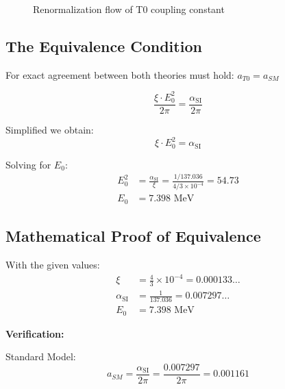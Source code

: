 \documentclass[12pt,a4paper]{article}
\numberwithin{equation}{section}
\newcommand{\xipar}{\xi}
\newcommand{\epsilonT}{\varepsilon}
\newcommand{\alphaSI}{\alpha_{\text{SI}}}
\newcommand{\Eo}{E_0}
\begin{document}
	\begin{figure}[h]
		\centering
		\caption{Renormalization flow of T0 coupling constant}
		\label{fig:renormalization_flow}
	\end{figure}
	
	\subsection{The Equivalence Condition}
	
	For exact agreement between both theories must hold: $a_{T0} = a_{SM}$
	
	\begin{equation}
		\frac{\xipar \cdot \Eo^2}{2\pi} = \frac{\alphaSI}{2\pi}
		\label{eq:equivalence_condition}
	\end{equation}
	
	Simplified we obtain:
	\begin{equation}
		\xipar \cdot \Eo^2 = \alphaSI
		\label{eq:simplified_equivalence}
	\end{equation}
	
	Solving for $\Eo$:
	\begin{align}
		\Eo^2 &= \frac{\alphaSI}{\xipar} = \frac{1/137.036}{4/3 \times 10^{-4}} = 54.73\\
		\Eo &= 7.398 \text{ MeV}
	\end{align}
	
	\subsection{Mathematical Proof of Equivalence}
	
	With the given values:
	\begin{align}
		\xipar &= \frac{4}{3} \times 10^{-4} = 0.000133\ldots\\
		\alphaSI &= \frac{1}{137.036} = 0.007297\ldots\\
		\Eo &= 7.398 \text{ MeV}
	\end{align}
	
	\textbf{Verification:}
	
	Standard Model:
	\begin{equation}
		a_{SM} = \frac{\alphaSI}{2\pi} = \frac{0.007297}{2\pi} = 0.001161
	\end{equation}
	
\end{document}
